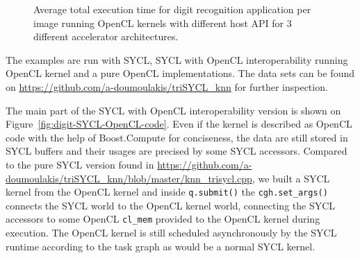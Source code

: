 \documentclass[sigplan]{acmart}
\begin{document}
\begin{figure}
  \caption{Average total execution time for digit recognition
    application per image running OpenCL kernels with different host
    API for 3 different accelerator architectures.}
  \label{fig:results-digit-recognition}
\end{figure}

The examples are run with SYCL, SYCL with OpenCL interoperability running
OpenCL kernel and a pure OpenCL implementations. The data sets can
be found on \url{https://github.com/a-doumoulakis/triSYCL_knn} for
further inspection.

The main part of the SYCL with OpenCL interoperability version is
shown on Figure~\ref{fig:digit-SYCL-OpenCL-code}. Even if the kernel is
described as OpenCL code with the help of Boost.Compute
\cite{Boost.Compute} for conciseness, the data are still stored in
SYCL buffers and their usages are precised by some SYCL
accessors. Compared to the pure SYCL version found in
\url{https://github.com/a-doumoulakis/triSYCL_knn/blob/master/knn_trisycl.cpp},
we built a SYCL kernel from the OpenCL kernel and inside
\lstinline|q.submit()| the \lstinline|cgh.set_args()| connects the
SYCL world to the OpenCL kernel world, connecting the SYCL accessors
to some OpenCL \lstinline|cl_mem| provided to the OpenCL kernel during
execution. The OpenCL kernel is still scheduled asynchronously by the
SYCL runtime according to the task graph as would be a normal SYCL
kernel.
\end{document}

